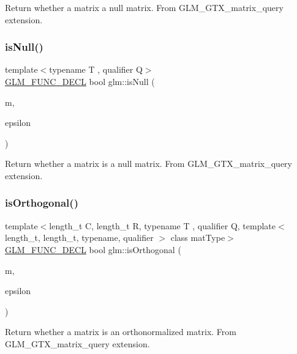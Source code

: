 Return whether a matrix a null matrix. From G\+L\+M\+\_\+\+G\+T\+X\+\_\+matrix\+\_\+query extension. \mbox{\label{group__gtx__matrix__query_ga2b98bb30a9fefa7cdea5f1dcddba677b}} 
\subsubsection{\texorpdfstring{is\+Null()}{isNull()}\hspace{0.1cm}{\footnotesize\ttfamily [3/3]}}
{\footnotesize\ttfamily template$<$typename T , qualifier Q$>$ \\
\mbox{\hyperlink{setup_8hpp_ab2d052de21a70539923e9bcbf6e83a51}{G\+L\+M\+\_\+\+F\+U\+N\+C\+\_\+\+D\+E\+CL}} bool glm\+::is\+Null (\begin{DoxyParamCaption}\item[{\mbox{\hyperlink{structglm_1_1mat}{mat}}$<$ 4, 4, T, Q $>$ const \&}]{m,  }\item[{T const \&}]{epsilon }\end{DoxyParamCaption})}

Return whether a matrix is a null matrix. From G\+L\+M\+\_\+\+G\+T\+X\+\_\+matrix\+\_\+query extension. \mbox{\label{group__gtx__matrix__query_ga58f3289f74dcab653387dd78ad93ca40}} 
\subsubsection{\texorpdfstring{is\+Orthogonal()}{isOrthogonal()}}
{\footnotesize\ttfamily template$<$length\+\_\+t C, length\+\_\+t R, typename T , qualifier Q, template$<$ length\+\_\+t, length\+\_\+t, typename, qualifier $>$ class mat\+Type$>$ \\
\mbox{\hyperlink{setup_8hpp_ab2d052de21a70539923e9bcbf6e83a51}{G\+L\+M\+\_\+\+F\+U\+N\+C\+\_\+\+D\+E\+CL}} bool glm\+::is\+Orthogonal (\begin{DoxyParamCaption}\item[{mat\+Type$<$ C, R, T, Q $>$ const \&}]{m,  }\item[{T const \&}]{epsilon }\end{DoxyParamCaption})}

Return whether a matrix is an orthonormalized matrix. From G\+L\+M\+\_\+\+G\+T\+X\+\_\+matrix\+\_\+query extension. 